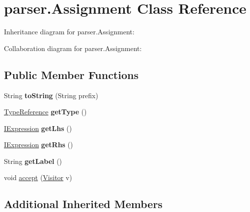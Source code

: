 \hypertarget{classparser_1_1_assignment}{}\section{parser.\+Assignment Class Reference}
\label{classparser_1_1_assignment}


Inheritance diagram for parser.\+Assignment\+:


Collaboration diagram for parser.\+Assignment\+:
\subsection*{Public Member Functions}
\begin{DoxyCompactItemize}
\item 
String {\bfseries to\+String} (String prefix)\hypertarget{classparser_1_1_assignment_a688eb102b0ceadafd3e50af4e79c5252}{}\label{classparser_1_1_assignment_a688eb102b0ceadafd3e50af4e79c5252}

\item 
\hyperlink{classparser_1_1_type_reference}{Type\+Reference} {\bfseries get\+Type} ()\hypertarget{classparser_1_1_assignment_a387838f293c8d818b621b59f25f529a0}{}\label{classparser_1_1_assignment_a387838f293c8d818b621b59f25f529a0}

\item 
\hyperlink{interfaceparser_1_1_i_expression}{I\+Expression} {\bfseries get\+Lhs} ()\hypertarget{classparser_1_1_assignment_a3a7a77e618caf58f12db69335950814a}{}\label{classparser_1_1_assignment_a3a7a77e618caf58f12db69335950814a}

\item 
\hyperlink{interfaceparser_1_1_i_expression}{I\+Expression} {\bfseries get\+Rhs} ()\hypertarget{classparser_1_1_assignment_a8e7a3912cef95b48e18b7fdfb38d39c0}{}\label{classparser_1_1_assignment_a8e7a3912cef95b48e18b7fdfb38d39c0}

\item 
String {\bfseries get\+Label} ()\hypertarget{classparser_1_1_assignment_a998d26f2574de7bbd3717573ced3cb79}{}\label{classparser_1_1_assignment_a998d26f2574de7bbd3717573ced3cb79}

\item 
void \hyperlink{classparser_1_1_assignment_a04fbe6fde440fec46719c76ee48cfe2d}{accept} (\hyperlink{interfacemain_1_1_visitor}{Visitor} v)
\end{DoxyCompactItemize}
\subsection*{Additional Inherited Members}


